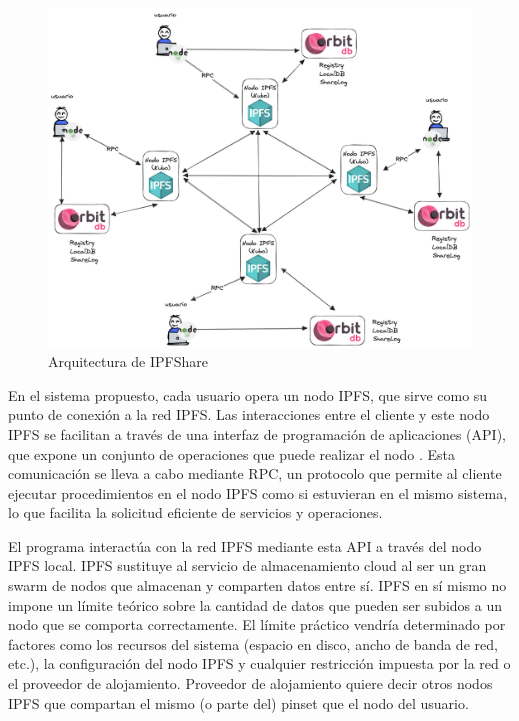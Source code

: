 \begin{figure}[H]
  \centering
  \includegraphics[width=\textwidth]{images/ipfshare-architecture.png}
  \caption{Arquitectura de IPFShare}
  \label{fig:ipfsharearch}
\end{figure}

En el sistema propuesto, cada usuario opera un nodo IPFS, que sirve como su punto de conexión a la red IPFS. Las interacciones entre el cliente y
este nodo IPFS se facilitan a través de una interfaz de programación de aplicaciones (API), que expone un conjunto de operaciones que puede realizar
el nodo \cite{KuboRPCAPI}. Esta comunicación se lleva a cabo mediante RPC, un protocolo que permite al cliente ejecutar procedimientos en el nodo IPFS como si estuvieran en el mismo sistema, lo que facilita la solicitud eficiente de servicios y operaciones.

El programa interactúa con la red IPFS mediante esta API a través del nodo IPFS local. IPFS sustituye al servicio de almacenamiento cloud
al ser un gran swarm de nodos que almacenan y comparten datos entre sí. IPFS en sí mismo no impone un límite teórico sobre la cantidad de datos que
pueden ser subidos a un nodo que se comporta correctamente. El límite práctico vendría determinado por factores como los recursos del sistema (espacio en
disco, ancho de banda de red, etc.), la configuración del nodo IPFS y cualquier restricción impuesta por la red o el proveedor de alojamiento. Proveedor
de alojamiento quiere decir otros nodos IPFS que compartan el mismo (o parte del) pinset que el nodo del usuario.

